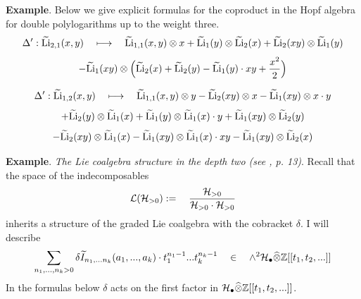 \documentclass[10pt]{article}
\begin{document}


{\bf Example}.  Below we give explicit formulas for  the coproduct in the Hopf algebra for double polylogarithms   up to the  weight three. 
$$
\Delta': {\widetilde {\rm Li}}_{2,1}(x, y) \quad  \longmapsto \quad{\widetilde {\rm Li}}_{1,1}(x, y)\otimes x +
{\widetilde {\rm Li}}_{1}(y) \otimes {\widetilde {\rm Li}}_{2}(x)
 +{\widetilde {\rm Li}}_{2}(x y) \otimes {\widetilde {\rm Li}}_{1}(y)
$$
$$
- {\widetilde {\rm Li}}_{1}(x y) \otimes \Bigl({\widetilde {\rm Li}}_{2}(x) + {\widetilde {\rm Li}}_{2}(y) - {\widetilde {\rm Li}}_{1}(y)\cdot xy + \frac{x^2}{2}\Bigr) 
$$

$$
\Delta': {\widetilde {\rm Li}}_{1,2}(x, y)  \quad   \longmapsto \quad {\widetilde {\rm Li}}_{1,1}(x, y)\otimes y -{\widetilde {\rm Li}}_{2}(xy)\otimes x - {\widetilde {\rm Li}}_{1}(xy)\otimes x \cdot y
$$
$$
+ {\widetilde {\rm Li}}_{2}(y) \otimes {\widetilde {\rm Li}}_{1}(x) + {\widetilde {\rm Li}}_{1}(y) \otimes {\widetilde {\rm Li}}_{1}(x)\cdot y 
+ {\widetilde {\rm Li}}_{1}(x y) \otimes  {\widetilde {\rm Li}}_{2}(y)  
$$
$$
- {\widetilde {\rm Li}}_{2}(x y) \otimes {\widetilde {\rm Li}}_{1}(x) - {\widetilde {\rm Li}}_{1}(x y) \otimes  {\widetilde {\rm Li}}_{1}(x)\cdot xy - {\widetilde {\rm Li}}_{1}(x y) \otimes  {\widetilde {\rm Li}}_{2}(x)   
$$

 
{\bf Example}. {\it The Lie coalgebra structure in the depth two (see \cite{G0}, p. 13)}. 
Recall that 
the space of the indecomposables
$$
{\cal L}({\cal H}_{>0}):= \quad \frac{{\cal H}_{>0}}
{{\cal H}_{>0} \cdot {\cal H}_{>0}}
$$ 
inherits  a structure of the graded Lie coalgebra with the cobracket $\delta$.  
I will describe
$$%
\sum _{n_1, ... , n_k > 0} \delta \widetilde {I}_{n_1, ... n_k}(a_1, ... ,a_k) \cdot t_1^{n_1 - 1 } ...
t_k^{n_k - 1 } \quad \in \quad \wedge^2{\cal H}_{\bullet} \widehat \otimes {\Z} [[t_1, t_2, ... ]]
$$%
In the formulas below $\delta$ acts  on the first factor in 
${\cal H}_{\bullet} \widehat \otimes {{\mathbb Z}} [[t_1, t_2, ... ]]$.
\end{document}
